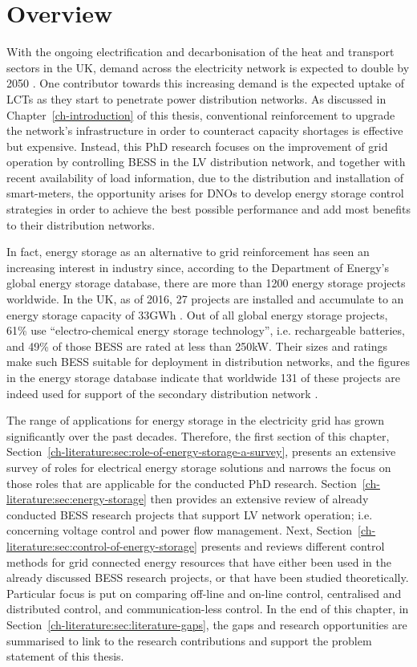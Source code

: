 \section{Overview}
\label{ch-literature:sec:overview}

With the ongoing electrification and decarbonisation of the heat and transport sectors in the UK, demand across the electricity network is expected to double by 2050 \cite{Wilks2010}.
One contributor towards this increasing demand is the expected uptake of LCTs as they start to penetrate power distribution networks.
As discussed in Chapter~\ref{ch-introduction} of this thesis, conventional reinforcement to upgrade the network's infrastructure in order to counteract capacity shortages is effective but expensive.
Instead, this PhD research focuses on the improvement of grid operation by controlling BESS in the LV distribution network, and together with recent availability of load information, due to the distribution and installation of smart-meters, the opportunity arises for DNOs to develop energy storage control strategies in order to achieve the best possible performance and add most benefits to their distribution networks.

In fact, energy storage as an alternative to grid reinforcement has seen an increasing interest in industry since, according to the Department of Energy's global energy storage database, there are more than 1200 energy storage projects worldwide.
In the UK, as of 2016, 27 projects are installed and accumulate to an energy storage capacity of 33GWh \cite{Garton2016}.
Out of all global energy storage projects, 61\% use ``electro-chemical energy storage technology'', i.e. rechargeable batteries, and 49\% of those BESS are rated at less than 250kW.
Their sizes and ratings make such BESS suitable for deployment in distribution networks, and the figures in the energy storage database indicate that worldwide 131 of these projects are indeed used for support of the secondary distribution network \cite{DOE-GESD}.

The range of applications for energy storage in the electricity grid has grown significantly over the past decades.
Therefore, the first section of this chapter, Section~\ref{ch-literature:sec:role-of-energy-storage-a-survey}, presents an extensive survey of roles for electrical energy storage solutions and narrows the focus on those roles that are applicable for the conducted PhD research.
Section~\ref{ch-literature:sec:energy-storage} then provides an extensive review of already conducted BESS research projects that support LV network operation; i.e. concerning voltage control and power flow management.
Next, Section~\ref{ch-literature:sec:control-of-energy-storage} presents and reviews different control methods for grid connected energy resources that have either been used in the already discussed BESS research projects, or that have been studied theoretically.
Particular focus is put on comparing off-line and on-line control, centralised and distributed control, and communication-less control.
In the end of this chapter, in Section~\ref{ch-literature:sec:literature-gaps}, the gaps and research opportunities are summarised to link to the research contributions and support the problem statement of this thesis.
